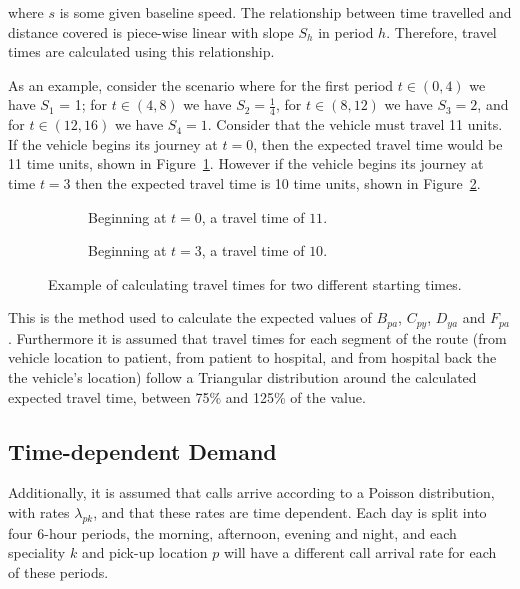 \documentclass[numbers,webpdf,imaman]{ima-authoring-template}%
\begin{document}
\noindent
where $s$ is some given baseline speed. The relationship between time travelled
and distance covered is piece-wise linear with slope $S_h$ in period $h$.
Therefore, travel times are calculated using this relationship.

As an example, consider the scenario where for the first period $t \in (0, 4)$
we have $S_1$ = 1; for $t \in (4, 8)$ we have $S_2 = \frac{1}{4}$, for
$t \in (8, 12)$ we have $S_3 = 2$, and for $t \in (12, 16)$ we have $S_4 = 1$.
Consider that the vehicle must travel 11 units. If the vehicle begins its
journey at $t=0$, then the expected travel time would be 11 time units, shown
in Figure~\ref{fig:travel_times_1}. However if the vehicle begins its journey
at time $t=3$ then the expected travel time is 10 time units, shown in
Figure~\ref{fig:travel_times_2}.

\begin{figure}
    \begin{center}
    \begin{subfigure}{6.6cm}
    
    \caption{Beginning at $t=0$, a travel time of $11$.}
    \label{fig:travel_times_1}
    \end{subfigure}
    \begin{subfigure}{6.6cm}
    
    \caption{Beginning at $t=3$, a travel time of $10$.}
    \label{fig:travel_times_2}
    \end{subfigure}
    \end{center}
    \caption{Example of calculating travel times for two different starting
    times.}
    \label{fig:travel_times}
\end{figure}

This is the method used to calculate the expected values of $B_{pa}$, $C_{py}$,
$D_{ya}$ and $F_{pa}$.
Furthermore it is assumed that travel times for each segment of the route
(from vehicle location to patient, from patient to hospital, and from hospital
back the the vehicle's location) follow a Triangular distribution around the
calculated expected travel time, between 75\% and 125\% of the value.


\subsection{Time-dependent Demand}
Additionally, it is assumed that calls arrive according to a Poisson
distribution, with rates $\lambda_{pk}$, and that these rates are time
dependent. Each day is split into four 6-hour periods, the morning, afternoon,
evening and night, and each speciality $k$ and pick-up location $p$ will have
a different call arrival rate for each of these periods.
\end{document}
